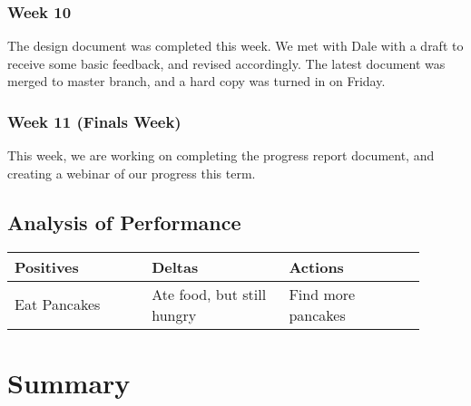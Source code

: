 \documentclass[draftclsnofoot,onecolumn,letterpaper,10pt]{IEEEtran}
\begin{document}
\subsubsection{Week 10} %
The design document was completed this week. We met with Dale with a draft to receive some basic feedback, and revised accordingly.
The latest document was merged to master branch, and a hard copy was turned in on Friday.

\subsubsection{Week 11 (Finals Week)} %
This week, we are working on completing the progress report document, and creating a webinar of our progress this term.

\subsection{Analysis of Performance}\label{sec:analysis}

\begin{center}
	\begin{tabular}{p{0.3\linewidth} p{0.3\linewidth} p{0.3\linewidth}}
		\toprule
		\textbf{Positives} & \textbf{Deltas} & \textbf{Actions} \\
		\midrule

		Eat Pancakes & Ate food, but still hungry & Find more pancakes \\

		\bottomrule
	\end{tabular}
\end{center}


%
%

\section{Summary}
\end{document}
